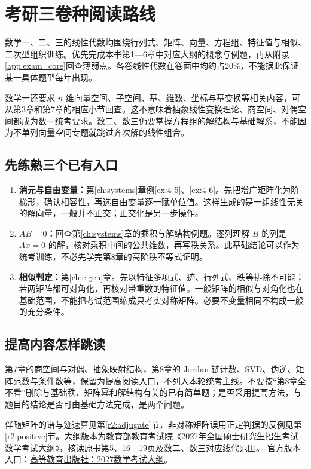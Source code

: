 \chapter*{考研三卷种阅读路线}
数学一、二、三的线性代数均围绕行列式、矩阵、向量、方程组、特征值与相似、二次型组织训练。优先完成本书第1—6章中对应大纲的概念与例题，再从附录\ref{app:exam_core}回查薄弱点。各卷线性代数在卷面中均约占20\%，不能据此保证某一具体题型每年出现。

数学一还要求 $n$ 维向量空间、子空间、基、维数、坐标与基变换等相关内容，可从第3章和第7章的相应小节回查。这不意味着抽象线性变换理论、商空间、对偶空间都成为数一统考要求。数二、数三仍要掌握方程组的解结构与基础解系，不能因为不单列向量空间专题就跳过齐次解的线性组合。

\section*{先练熟三个已有入口}
\begin{enumerate}
\item \textbf{消元与自由变量：}第\ref{ch:systems}章例\ref{ex:4-5}、\ref{ex:4-6}。先把增广矩阵化为阶梯形，确认相容性，再选自由变量逐一赋单位值。这样生成的是一组线性无关的解向量，一般并不正交；正交化是另一步操作。
\item \textbf{$AB=0$：}回查第\ref{ch:systems}章的乘积与解结构例题。逐列理解 $B$ 的列是 $Ax=0$ 的解，核对乘积中间的公共维数，再写秩关系。此基础结论可以作为统考训练，不必先学完第8章的高阶秩不等式证明。
\item \textbf{相似判定：}第\ref{ch:eigen}章。先以特征多项式、迹、行列式、秩等排除不可能；若两矩阵都可对角化，再核对带重数的特征值。一般矩阵的相似与对角化也在基础范围，不能把考试范围缩成只考实对称矩阵。必要不变量相同不构成一般的充分条件。
\end{enumerate}

\section*{提高内容怎样跳读}
第7章的商空间与对偶、抽象映射结构，第8章的 Jordan 链计数、SVD、伪逆、矩阵范数与条件数等，保留为提高阅读入口，不列入本轮统考主线。不要按“第8章全不看”删除与基础秩、矩阵幂和解结构有关的已有简单题；是否采用提高方法，与题目的结论是否可由基础方法完成，是两个问题。

伴随矩阵的谱与迹速算见第\ref{r2:adjugate}节，非对称矩阵误用正定判据的反例见第\ref{r2:positive}节。大纲版本为教育部教育考试院《2027年全国硕士研究生招生考试数学考试大纲》，核读原书第5、16—19页及数二、数三对应线代范围。
官方版本入口：\href{https://xuanshu.hep.com.cn/front/book/findBookDetails?bookId=6aa1910be119ac97297a608f}{高等教育出版社：2027数学考试大纲}。
